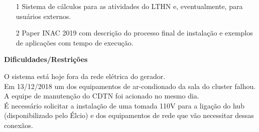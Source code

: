 \begin{itemize}
	\item[1] Sistema de cálculos para as atividades do LTHN e, eventualmente, para usuários externos.
	\item[2] Paper INAC 2019 com descrição do processo final de instalação e exemplos de aplicações com tempo de execução.

\end{itemize}


\textbf{Dificuldades/Restrições}

O sistema está hoje fora da rede elétrica do gerador.\\

Em 13/12/2018 um dos equipamentos de ar-condionado da sala do cluster falhou. A equipe de manutenção do CDTN foi acionado no mesmo dia.\\

É necessário solicitar a instalação de uma tomada 110V para a ligação do hub 
(disponibilizado pelo Élcio) e dos equipamentos de rede que vão necessitar 
dessas conexãos.\\


